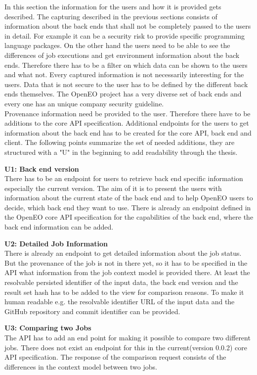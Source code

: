 \documentclass[draft,final]{vutinfth} %
\begin{document}
In this section the information for the users and how it is provided gets described. The capturing described in the previous sections consists of information about the back ends that shall not be completely passed to the users in detail. For example it can be a security risk to provide specific programming language packages. On the other hand the users need to be able to see the differences of job executions and get environment information about the back ends. Therefore there has to be a filter on which data can be shown to the users and what not. Every captured information is not necessarily interesting for the users. Data that is not secure to the user has to be defined by the different back ends themselves. The OpenEO project has a very diverse set of back ends and every one has an unique company security guideline.\\ 
Provenance information need be provided to the user. Therefore there have to be additions to the core API specification. Additional endpoints for the users to get information about the back end has to be created for the core API, back end and client. The following points summarize the set of needed additions, they are structured with a "U" in the beginning to add readability through the thesis. 

\textbf{U1: Back end version} \\
There has to be an endpoint for users to retrieve back end specific information especially the current version. The aim of it is to present the users with information about the current state of the back end and to help OpenEO users to decide, which back end they want to use. There is already an endpoint defined in the OpenEO core API specification for the capabilities of the back end, where the back end information can be added. 

\textbf{U2: Detailed Job Information} \\
There is already an endpoint to get detailed information about the job status. But the provenance of the job is not in there yet, so it has to be specified in the API what information from the job context model is provided there. At least the resolvable persisted identifier of the input data, the back end version and the result set hash has to be added to the view for comparison reasons. To make it human readable e.g. the resolvable identifier URL of the input data and the GitHub repository and commit identifier can be provided.   

\textbf{U3: Comparing two Jobs} \\
The API has to add an end point for making it possible to compare two different jobs. There does not exist an endpoint for this in the current(version 0.0.2) core API specification. The response of the comparison request consists of the differences in the context model between two jobs. 
\end{document}
